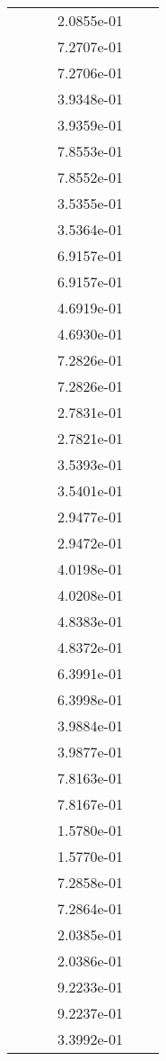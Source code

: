 \begin{xltabular}{\textwidth}{r|rS[table-format=1.3e+2]S[table-format=1.4e+2]S[table-format=1.4e+2]S[table-format=-1.5]}
&  &  & 2.0855e-01 & & \\
&  &  & 7.2707e-01 & & \\
&  &  & 7.2706e-01 & & \\
&  &  & 3.9348e-01 & & \\
&  &  & 3.9359e-01 & & \\
&  &  & 7.8553e-01 & & \\
&  &  & 7.8552e-01 & & \\
&  &  & 3.5355e-01 & & \\
&  &  & 3.5364e-01 & & \\
&  &  & 6.9157e-01 & & \\
&  &  & 6.9157e-01 & & \\
&  &  & 4.6919e-01 & & \\
&  &  & 4.6930e-01 & & \\
&  &  & 7.2826e-01 & & \\
&  &  & 7.2826e-01 & & \\
&  &  & 2.7831e-01 & & \\
&  &  & 2.7821e-01 & & \\
&  &  & 3.5393e-01 & & \\
&  &  & 3.5401e-01 & & \\
&  &  & 2.9477e-01 & & \\
&  &  & 2.9472e-01 & & \\
&  &  & 4.0198e-01 & & \\
&  &  & 4.0208e-01 & & \\
&  &  & 4.8383e-01 & & \\
&  &  & 4.8372e-01 & & \\
&  &  & 6.3991e-01 & & \\
&  &  & 6.3998e-01 & & \\
&  &  & 3.9884e-01 & & \\
&  &  & 3.9877e-01 & & \\
&  &  & 7.8163e-01 & & \\
&  &  & 7.8167e-01 & & \\
&  &  & 1.5780e-01 & & \\
&  &  & 1.5770e-01 & & \\
&  &  & 7.2858e-01 & & \\
&  &  & 7.2864e-01 & & \\
&  &  & 2.0385e-01 & & \\
&  &  & 2.0386e-01 & & \\
&  &  & 9.2233e-01 & & \\
&  &  & 9.2237e-01 & & \\
&  &  & 3.3992e-01 & & \\

\end{xltabular}

